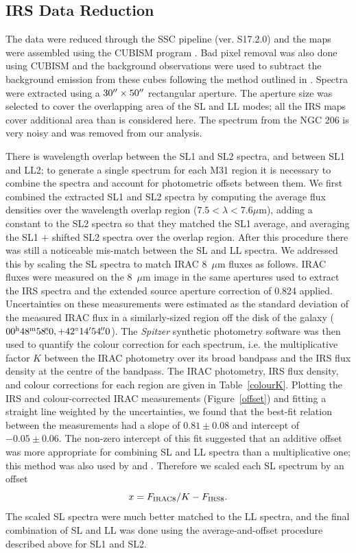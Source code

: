 \subsection{IRS Data Reduction}

The data were reduced through the SSC pipeline (ver. S17.2.0) and the maps were assembled using the CUBISM program \citep{Smith:2007fk}. 
Bad pixel removal was also done using CUBISM and the background observations were used to subtract the background emission from these cubes 
following the method outlined in \citet{Gordon:2008lr}. Spectra were extracted using a $30\hbox{$^{\prime\prime}$}\times50\hbox{$^{\prime\prime}$}$   rectangular aperture. 
The aperture size was selected to cover the overlapping area of the SL and LL modes; all the IRS maps cover additional area than is considered here.
The spectrum from the NGC 206 is very noisy and was removed from our analysis. 


There is wavelength overlap between the SL1 and SL2 spectra, and between SL1 and LL2;
to generate a single spectrum for each M31 region it is necessary to combine the spectra and
account for photometric offsets between them. We first combined the extracted SL1 and SL2 
spectra by computing the average flux densities over the wavelength overlap region ($7.5 < \lambda< 7.6\mu$m),
adding a constant  to the SL2 spectra so that they matched the SL1 average,
and averaging the SL1 $+$ shifted SL2 spectra over the overlap region.
After this procedure there was still a noticeable mis-match between the SL and LL spectra. We addressed this
by scaling the SL spectra to match IRAC 8~$\mu$m fluxes as follows. IRAC fluxes were measured
on the 8~$\mu$m image \citep{Barmby2006lr} in the same apertures used to extract the IRS spectra
and the extended source  aperture correction of 0.824 applied.
Uncertainties on these measurements were estimated as the standard deviation of the measured
IRAC flux in a similarly-sized region off the disk of the galaxy ($00^{\rmn{h}}48^{\rmn{m}}58\fs0, +42\degr14\arcmin54\farcs0$). 
The {\em Spitzer} synthetic photometry software \citep{SpitzerDAC} 
was then used to quantify the colour correction for each spectrum, i.e. the
multiplicative factor $K$ between the IRAC photometry over its broad bandpass and the IRS flux
density at the centre of the bandpass. The IRAC photometry, IRS flux density, and colour corrections 
for each region are given in Table~\ref{colourK}. Plotting the IRS  and colour-corrected IRAC measurements
(Figure~\ref{offset}) and fitting a straight line weighted by the uncertainties, we found that the best-fit relation 
between the measurements had a slope of $0.81\pm0.08$  and intercept of $-0.05\pm0.06$. 
The non-zero intercept of this fit suggested that an additive offset was more appropriate for combining SL and LL
spectra than a multiplicative one; this method was also used by \citet{Gordon:2008lr} and \citet{Engelbracht_2008}.
Therefore we scaled each SL spectrum by an offset 
\begin{equation}
x = F_{\rm IRAC8}/K -   F_{\rm IRS8}.
\label{eq:offset}
\end{equation}
The scaled SL spectra were much better matched to the LL spectra, and the final combination
of SL and LL was done using the average-and-offset procedure described above for SL1 and SL2.


